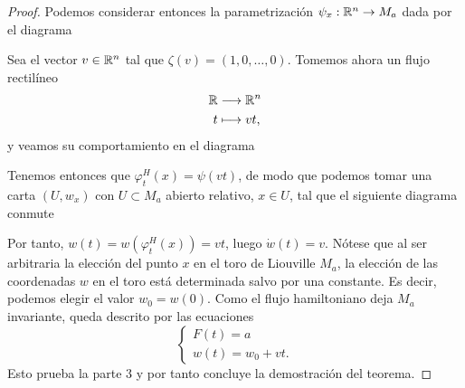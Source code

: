 \begin{proof}
   Podemos considerar entonces la parametrización $\psi_x:\mathbb{R}^n\rightarrow M_a$ dada por el diagrama
  \begin{center}
   \end{center}
   Sea el vector $v\in \mathbb{R}^n$ tal que $\zeta(v)=(1,0,\dots,0)$. Tomemos ahora un flujo rectilíneo
   \begin{align*}
      \mathbb{R}&\longrightarrow \mathbb{R}^n\\ 
       t &\longmapsto  vt,
     \end{align*}
   y veamos su comportamiento en el diagrama 
   \begin{center}
    \end{center}
    Tenemos entonces que $\varphi_t^H(x)=\psi(vt)$, de modo que podemos tomar una carta $(U,w_x)$ con $U\subset M_a$ abierto relativo, $x\in U$, tal que el siguiente diagrama conmute
    \begin{center}
     \end{center}
     Por tanto, $w(t)=w(\varphi_t^H(x))=vt$, luego $\dot w(t)=v$. Nótese que al ser arbitraria la elección del punto $x$ en el toro de Liouville $M_a$, la elección de las coordenadas $w$ en el toro está determinada salvo por una constante. Es decir, podemos elegir el valor $w_{0}=w(0)$. Como el flujo hamiltoniano deja $M_a$ invariante, queda descrito por las ecuaciones
 \begin{equation*}
   \begin{cases}
     F(t)=a \\
     w(t)=w_{0}+vt.
   \end{cases}
 \end{equation*}
Esto prueba la parte $3$ y por tanto concluye la demostración del teorema.
 \end{proof}

